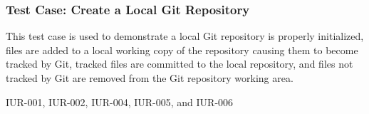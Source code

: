 \subsubsection{Test Case: Create a Local Git Repository}
\begin{description}[align=right,leftmargin=3.2cm,labelindent=3.0cm]
\item[Purpose:] This test case is used to demonstrate a local Git repository is properly initialized, files are added to a local working copy of the repository causing them to become tracked by Git, tracked files are committed to the local repository, and files not tracked by Git are removed from the Git repository working area.
\item[Requirement:] IUR-001, IUR-002, IUR-004, IUR-005, and IUR-006
\end{description}
